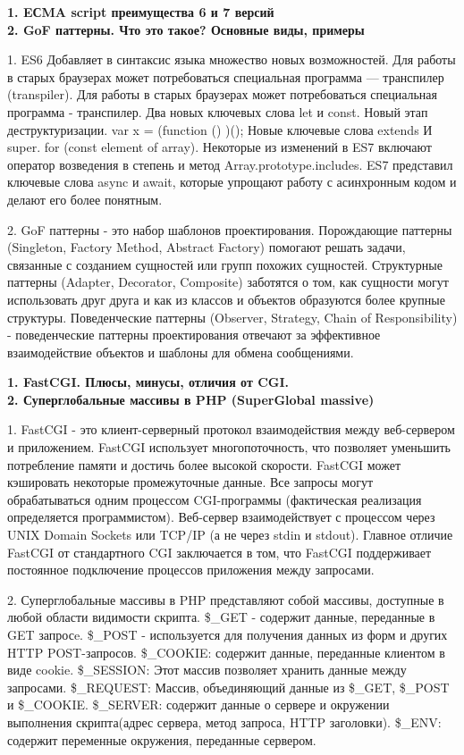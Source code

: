 \documentclass{article}
\begin{document}
\hfill
\begin{minipage}{.3\textwidth}
    \textbf{1. EСMA script преимущества 6 и 7 версий}\\
    \textbf{2. GoF паттерны. Что это такое? Основные виды, примеры}

1. ES6 Добавляет в синтаксис языка множество новых возможностей. Для работы в старых браузерах может потребоваться специальная программа — транспилер (transpiler). Для работы в старых браузерах может потребоваться
специальная программа - транспилер. Два новых ключевых слова let и const. Новый этап деструктуризации. var x = (function () {})(); Новые ключевые слова extends И super. for (const element of array).
Некоторые из изменений в ES7 включают оператор возведения в степень и метод Array.prototype.includes.
ES7 представил ключевые слова async и await, которые упрощают работу с асинхронным кодом и делают его более понятным.

2. GoF паттерны - это набор шаблонов проектирования. Порождающие паттерны (Singleton, Factory Method, Abstract Factory) помогают решать задачи, связанные с созданием сущностей или групп похожих сущностей. Структурные паттерны (Adapter, Decorator, Composite) заботятся о том, как сущности могут использовать друг друга и как из классов и объектов образуются более крупные структуры. 
Поведенческие паттерны (Observer, Strategy, Chain of Responsibility) - поведенческие паттерны проектирования отвечают за эффективное взаимодействие объектов и шаблоны для обмена сообщениями.
\end{minipage}
\hfill
\begin{minipage}{.3\textwidth}
    \textbf{1. FastCGI. Плюсы, минусы, отличия от CGI.}\\
    \textbf{2. Суперглобальные массивы в PHP (SuperGlobal massive)}

1. FastCGI - это клиент-серверный протокол взаимодействия между веб-сервером и приложением. FastCGI использует многопоточность, что позволяет уменьшить потребление памяти и достичь более высокой скорости. FastCGI может кэшировать некоторые промежуточные данные. Все запросы могут обрабатываться одним процессом CGI-программы (фактическая реализация определяется программистом).
Веб-сервер взаимодействует с процессом через UNIX Domain Sockets или TCP/IP (а не через stdin и stdout).
Главное отличие FastCGI от стандартного CGI заключается в том, что FastCGI поддерживает постоянное подключение процессов приложения между запросами.

2. Суперглобальные массивы в PHP представляют собой массивы, доступные в любой области видимости скрипта. 
\$\_GET - содержит данные, переданные в GET запросe. \$\_POST - используется для получения данных из форм и других HTTP POST-запросов.
\$\_COOKIE: содержит данные, переданные клиентом в виде cookie.
\$\_SESSION: Этот массив позволяет хранить данные между запросами.
\$\_REQUEST: Массив, объединяющий данные из \$\_GET, \$\_POST и \$\_COOKIE.
\$\_SERVER: содержит данные о сервере и окружении выполнения скрипта(адрес сервера, метод запроса, HTTP заголовки).
\$\_ENV: содержит переменные окружения, переданные сервером.
\end{minipage}
\end{document}
